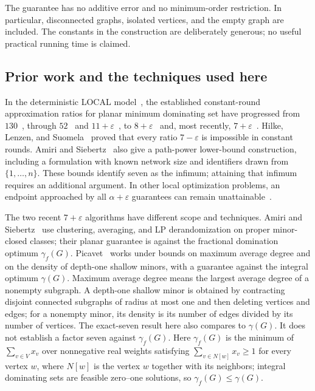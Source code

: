 \documentclass[11pt,a4paper]{article}
\theoremstyle{definition}
\theoremstyle{remark}
\begin{document}
The guarantee has no additive error and no minimum-order restriction.
In particular, disconnected graphs, isolated vertices, and the empty graph
are included. The constants in the construction are deliberately generous;
no useful practical running time is claimed.

\subsection{Prior work and the techniques used here}

In the deterministic LOCAL model~\cite{Linial92,Suomela13}, the established
constant-round approximation ratios for planar minimum dominating set have
progressed from $130$~\cite{LPW13}, through $52$~\cite{Waw14} and
$11+\varepsilon$~\cite{HSV22,HKSS25}, to $8+\varepsilon$~\cite{Waw26} and,
most recently, $7+\varepsilon$~\cite{AS26,Picavet26}. Hilke, Lenzen, and
Suomela~\cite{HLS14} proved that every ratio $7-\varepsilon$ is impossible in
constant rounds. Amiri and Siebertz~\cite{AS26} also give a path-power
lower-bound construction, including a formulation with known network size
and identifiers drawn from $\{1,\ldots,n\}$. These bounds identify seven as
the infimum; attaining that infimum requires an additional argument. In
other local optimization problems, an endpoint approached by all
$\alpha+\varepsilon$ guarantees can remain unattainable~\cite{FHK11}.

The two recent $7+\varepsilon$ algorithms have different scope and techniques.
Amiri and Siebertz~\cite{AS26} use clustering, averaging, and LP
derandomization on proper minor-closed classes; their planar guarantee is
against the fractional domination optimum $\gamma_f(G)$. Picavet~\cite{Picavet26}
works under bounds on maximum average degree and on the density of
depth-one shallow minors, with a guarantee against the integral optimum
$\gamma(G)$. Maximum average degree means the largest average degree of
a nonempty subgraph. A depth-one shallow minor is obtained by contracting
disjoint connected subgraphs of radius at most one and then deleting
vertices and edges; for a nonempty minor, its density is its number of
edges divided by its number of vertices. The exact-seven result here also
compares to $\gamma(G)$.
It does not establish a factor seven against $\gamma_f(G)$.
Here $\gamma_f(G)$ is the minimum of $\sum_{v\in V}x_v$ over
nonnegative real weights satisfying $\sum_{v\in N[w]}x_v\geq1$ for
every vertex $w$, where $N[w]$ is the vertex $w$ together with its
neighbors; integral dominating sets are feasible zero--one
solutions, so $\gamma_f(G)\leq\gamma(G)$.
\end{document}
